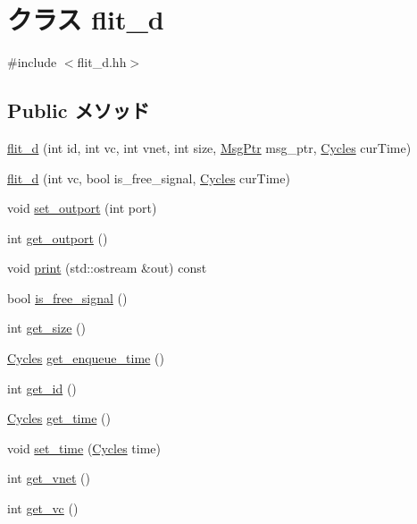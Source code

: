 \hypertarget{classflit__d}{
\section{クラス flit\_\-d}
\label{classflit__d}
}


{\ttfamily \#include $<$flit\_\-d.hh$>$}\subsection*{Public メソッド}
\begin{DoxyCompactItemize}
\item 
\hyperlink{classflit__d_ac5917ce8e5bb6b61354e557799d84b11}{flit\_\-d} (int id, int vc, int vnet, int size, \hyperlink{classRefCountingPtr}{MsgPtr} msg\_\-ptr, \hyperlink{classCycles}{Cycles} curTime)
\item 
\hyperlink{classflit__d_a1056a6d2f4569a75cd6db9b92b2fc0a2}{flit\_\-d} (int vc, bool is\_\-free\_\-signal, \hyperlink{classCycles}{Cycles} curTime)
\item 
void \hyperlink{classflit__d_aa1d4d1a6b00a00a26d282182257c5897}{set\_\-outport} (int port)
\item 
int \hyperlink{classflit__d_a47a477d5bcd6a5d32aa4028e103f06ca}{get\_\-outport} ()
\item 
void \hyperlink{classflit__d_ac55fe386a101fbae38c716067c9966a0}{print} (std::ostream \&out) const 
\item 
bool \hyperlink{classflit__d_ae4729085999fb1d52c290270c08abbcf}{is\_\-free\_\-signal} ()
\item 
int \hyperlink{classflit__d_a885808baa3d930eac7a825f7d49f73d7}{get\_\-size} ()
\item 
\hyperlink{classCycles}{Cycles} \hyperlink{classflit__d_a8b7947d2d5ef2f4c39d644d6b8070acb}{get\_\-enqueue\_\-time} ()
\item 
int \hyperlink{classflit__d_a1f0b8f09abd10342468ce33a1da15557}{get\_\-id} ()
\item 
\hyperlink{classCycles}{Cycles} \hyperlink{classflit__d_a92a32b4bfae6e08f31ab344b857eb8c3}{get\_\-time} ()
\item 
void \hyperlink{classflit__d_ae1056dab3fa41e4faf25e82848d0a6a5}{set\_\-time} (\hyperlink{classCycles}{Cycles} time)
\item 
int \hyperlink{classflit__d_af5cc1829c8bdf22f8c0e7225f525c2ba}{get\_\-vnet} ()
\item 
int \hyperlink{classflit__d_a80b1148ab9b0187938de72d6b03075b1}{get\_\-vc} ()
\item 

\end{DoxyCompactItemize}
